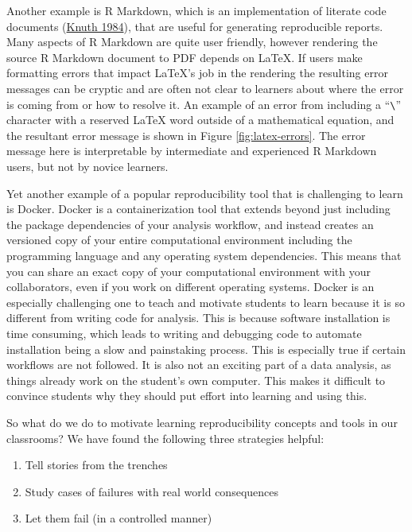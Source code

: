 \documentclass[
  12 pt,
]{paper}
\providecommand{\tightlist}{%
  \setlength{\itemsep}{0pt}\setlength{\parskip}{0pt}}
\begin{document}
Another example is R Markdown,
which is an implementation of literate code documents (\protect\hyperlink{ref-knuth1984literate}{Knuth 1984}),
that are useful for generating reproducible reports.
Many aspects of R Markdown are quite user friendly,
however rendering the source R Markdown document to PDF depends on LaTeX.
If users make formatting errors that impact LaTeX's job in the rendering
the resulting error messages can be cryptic
and are often not clear to learners about where the error is coming from
or how to resolve it.
An example of an error from including a ``\texttt{\textbackslash{}}'' character with a reserved
LaTeX word outside of a mathematical equation,
and the resultant error message is shown in Figure \ref{fig:latex-errors}.
The error message here is interpretable by intermediate and experienced
R Markdown users, but not by novice learners.

Yet another example of a popular reproducibility tool that is challenging to learn is
Docker.
Docker is a containerization tool that extends beyond
just including the package dependencies of your analysis workflow,
and instead creates an versioned copy of your entire computational environment
including the programming language and any operating system dependencies.
This means that you can share an exact copy of your computational environment
with your collaborators, even if you work on different operating systems.
Docker is an especially challenging one to
teach and motivate students to learn
because it is so different from writing code for analysis.
This is because software installation is time consuming,
which leads to writing and debugging code to automate installation
being a slow and painstaking process.
This is especially true if certain workflows are not followed.
It is also not an exciting part of a data analysis,
as things already work on the student's own computer.
This makes it difficult to convince students why they should put effort into learning
and using this.

So what do we do to motivate learning reproducibility concepts and tools in our
classrooms? We have found the following three strategies helpful:

\begin{enumerate}
\def\labelenumi{\arabic{enumi}.}
\tightlist
\item
  Tell stories from the trenches
\item
  Study cases of failures with real world consequences
\item
  Let them fail (in a controlled manner)
\end{enumerate}
\end{document}
